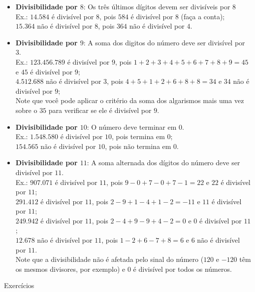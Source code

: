 \documentclass[12pt]{report}
\newcommand{\1}{\faThermometerEmpty}
\newcommand{\2}{\faThermometerQuarter}
\newcommand{\3}{\faThermometerHalf}
\newcommand{\4}{\faThermometerThreeQuarters}
\newcommand{\5}{\faThermometerFull}
\begin{document}
\begin{itemize}
    
    \item \textbf{Divisibilidade por $8$}:  Os três últimos dígitos devem ser divisíveis por $8$\\
    Ex.: $14.584$ é divisível por $8$, pois $584$ é divisível por $8$ (faça a conta);\\
    \phantom{Ex.: }$15.364$ não é divisível por $8$, pois $364$ não é divisível por $4$.
    
    \item \textbf{Divisibilidade por $9$}: A soma dos digitos do número deve ser divisível por 3. \\
    Ex.: $123.456.789$ é divisível por $9$, pois $1+2+3+4+5+6+7+8+9=45$ e $45$ é divisível por $9$; \\
    \phantom{Ex.: }$4.512.688$ não é divisível por $3$, pois $4+5+1+2+6+8+8=34$ e $34$ não é divisível por $9$;\\
    Note que você pode aplicar o critério da soma dos algarismos mais uma vez sobre o $35$ para verificar se ele é divisível por $9$.
    
    \item \textbf{Divisibilidade por $10$}: O número deve terminar em $0$.\\
    Ex.: $1.548.580$ é divisível por $10$, pois termina em $0$;\\
    \phantom{Ex.: }$154.565$ não é divisível por $10$, pois não termina em $0$.
    
    \item \textbf{Divisibilidade por $11$}: A soma alternada dos dígitos do número deve ser divisível por $11$.\\
    Ex.: $907.071$ é divisível por $11$, pois $9-0+7-0+7-1=22$ e $22$ é divisível por $11$; \\
    \phantom{Ex.: }$291.412$ é divisível por $11$, pois $2-9+1-4+1-2=-11$ e $11$ é divisível por $11$; \\
    \phantom{Ex.: }$249.942$ é divisível por $11$, pois $2-4+9-9+4-2=0$ e $0$ é divisível por $11$; \\
    \phantom{Ex.: }$12.678$ não é divisível por $11$, pois $1-2+6-7+8=6$ e $6$ não é divisível por $11$. \\
    Note que a divisibilidade não é afetada pelo sinal do número ($120$ e $-120$ têm os mesmos divisores, por exemplo) e $0$ é divisível por todos os números.
\end{itemize}

\pagebreak

\begin{center}
{\Large Exercícios}
\end{center}
\end{document}
